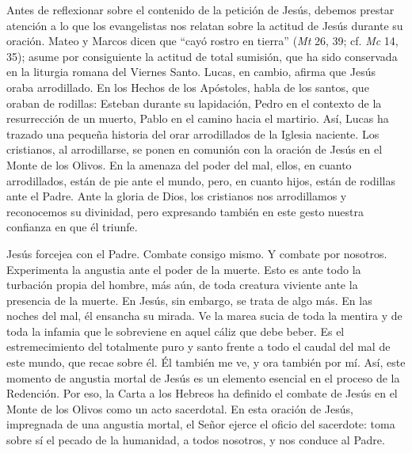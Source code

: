 			\begin{body}Antes de reflexionar sobre el contenido de la petición de Jesús, debemos prestar atención a lo que los evangelistas nos relatan sobre la actitud de Jesús durante su oración. Mateo y Marcos dicen que “cayó rostro en tierra” (\textit{Mt} 26, 39; cf. \textit{Mc} 14, 35); asume por consiguiente la actitud de total sumisión, que ha sido conservada en la liturgia romana del Viernes Santo. Lucas, en cambio, afirma que Jesús oraba arrodillado. En los Hechos de los Apóstoles, habla de los santos, que oraban de rodillas: Esteban durante su lapidación, Pedro en el contexto de la resurrección de un muerto, Pablo en el camino hacia el martirio. Así, Lucas ha trazado una pequeña historia del orar arrodillados de la Iglesia naciente. Los cristianos, al arrodillarse, se ponen en comunión con la oración de Jesús en el Monte de los Olivos. En la amenaza del poder del mal, ellos, en cuanto arrodillados, están de pie ante el mundo, pero, en cuanto hijos, están de rodillas ante el Padre. Ante la gloria de Dios, los cristianos nos arrodillamos y reconocemos su divinidad, pero expresando también en este gesto nuestra confianza en que él triunfe.\end{body}
			
			\begin{body}Jesús forcejea con el Padre. Combate consigo mismo. Y combate por nosotros. Experimenta la angustia ante el poder de la muerte. Esto es ante todo la turbación propia del hombre, más aún, de toda creatura viviente ante la presencia de la muerte. En Jesús, sin embargo, se trata de algo más. En las noches del mal, él ensancha su mirada. Ve la marea sucia de toda la mentira y de toda la infamia que le sobreviene en aquel cáliz que debe beber. Es el estremecimiento del totalmente puro y santo frente a todo el caudal del mal de este mundo, que recae sobre él. Él también me ve, y ora también por mí. Así, este momento de angustia mortal de Jesús es un elemento esencial en el proceso de la Redención. Por eso, la Carta a los Hebreos ha definido el combate de Jesús en el Monte de los Olivos como un acto sacerdotal. En esta oración de Jesús, impregnada de una angustia mortal, el Señor ejerce el oficio del sacerdote: toma sobre sí el pecado de la humanidad, a todos nosotros, y nos conduce al Padre.\end{body}
			
